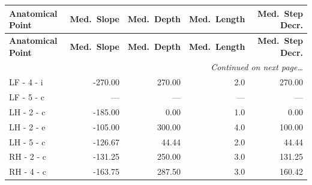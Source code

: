\documentclass[a4paper,11pt]{article}
\begin{document}
\begin{small}
\begin{longtable}{p{4.5cm}rrrr}
\toprule
\textbf{Anatomical Point} &
\textbf{Med.\ Slope} &
\textbf{Med.\ Depth} &
\textbf{Med.\ Length} &
\textbf{Med.\ Step Decr.} \\
\midrule
\endfirsthead
\toprule
\textbf{Anatomical Point} &
\textbf{Med.\ Slope} &
\textbf{Med.\ Depth} &
\textbf{Med.\ Length} &
\textbf{Med.\ Step Decr.} \\
\midrule
\endhead
\midrule
\multicolumn{5}{r}{\small\emph{Continued on next page\ldots}} \\
\endfoot
\bottomrule
\endlastfoot
LF - 4 - i & -270.00 & 270.00 & 2.0 & 270.00 \\
LF - 5 - c & --- & --- & --- & --- \\
LH - 2 - c & -185.00 & 0.00 & 1.0 & 0.00 \\
LH - 2 - e & -105.00 & 300.00 & 4.0 & 100.00 \\
LH - 5 - c & -126.67 & 44.44 & 2.0 & 44.44 \\
RH - 2 - c & -131.25 & 250.00 & 3.0 & 131.25 \\
RH - 4 - c & -163.75 & 287.50 & 3.0 & 160.42 \\
\end{longtable}
\end{small}
\end{document}
